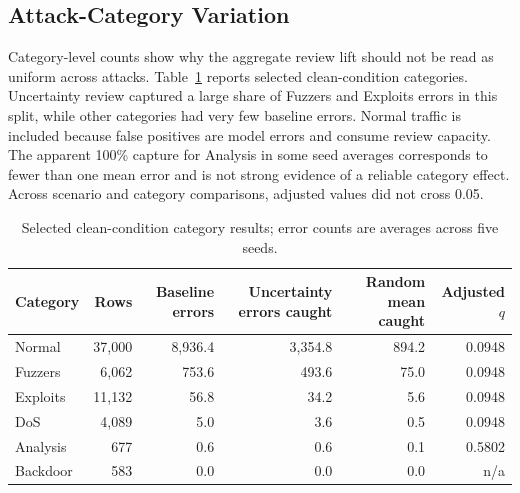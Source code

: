 \documentclass[conference]{IEEEtran}
\begin{document}
\subsection{Attack-Category Variation}
Category-level counts show why the aggregate review lift should not be read as uniform across attacks. Table~\ref{tab:categories} reports selected clean-condition categories. Uncertainty review captured a large share of Fuzzers and Exploits errors in this split, while other categories had very few baseline errors. Normal traffic is included because false positives are model errors and consume review capacity. The apparent 100\% capture for Analysis in some seed averages corresponds to fewer than one mean error and is not strong evidence of a reliable category effect. Across scenario and category comparisons, adjusted values did not cross 0.05.

\begin{table}[t]
\caption{Selected clean-condition category results; error counts are averages across five seeds.}
\label{tab:categories}
\centering
\small
\begin{tabular}{lrrrrr}
\toprule
Category & Rows & Baseline errors & Uncertainty errors caught & Random mean caught & Adjusted $q$ \\
\midrule
Normal & 37,000 & 8,936.4 & 3,354.8 & 894.2 & 0.0948 \\
Fuzzers & 6,062 & 753.6 & 493.6 & 75.0 & 0.0948 \\
Exploits & 11,132 & 56.8 & 34.2 & 5.6 & 0.0948 \\
DoS & 4,089 & 5.0 & 3.6 & 0.5 & 0.0948 \\
Analysis & 677 & 0.6 & 0.6 & 0.1 & 0.5802 \\
Backdoor & 583 & 0.0 & 0.0 & 0.0 & n/a \\
\bottomrule
\end{tabular}
\end{table}
\end{document}
